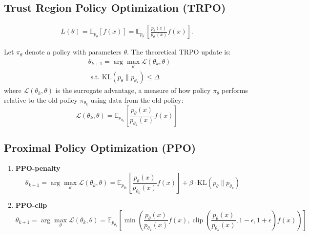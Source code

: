 \documentclass[
        11pt, %
	a4paper, %
]{LegrandOrangeBook}
\begin{document}
\subsection{Trust Region Policy Optimization (TRPO)}

\begin{align}
    L(\theta)
    =\mathbb{E}_{p_\theta}\left[f(x)\right]
    =\mathbb{E}_{p_{\theta^{\prime}}}\left[ \frac{p_\theta(x)}{p_{\theta^{\prime}}(x)} f(x)\right].
\end{align}

Let $\pi_\theta$ denote a policy with parameters $\theta$. The theoretical TRPO update is:
\begin{equation}
\begin{aligned}
& \theta_{k+1}=\arg \max _\theta \mathcal{L}\left(\theta_k, \theta\right) \\
& \text { s.t. } \mathrm{KL}\left(p_\theta \| p_{\theta_k} \right) \leq \Delta
\end{aligned}
\end{equation}
where $\mathcal{L}\left(\theta_k, \theta\right)$ is the surrogate advantage, a measure of how policy $\pi_\theta$ performs relative to the old policy $\pi_{\theta_k}$ using data from the old policy:
\begin{equation}
    \mathcal{L}\left(\theta_k, \theta\right)
=\mathbb{E}_{p_{\theta_k}}\left[ \frac{p_\theta(x)}{p_{\theta_k}(x)} f(x)\right]
\end{equation}

\subsection{Proximal Policy Optimization (PPO)}

\begin{enumerate}
    \item \textbf{PPO-penalty}
    \begin{equation}
    \theta_{k+1}=\arg \max _\theta
    \mathcal{L}\left(\theta_k, \theta\right)
    =\mathbb{E}_{p_{\theta_k}}\left[ \frac{p_\theta(x)}{p_{\theta_k}(x)} f(x)\right] + \beta \cdot \mathrm{KL}\left(p_\theta \| p_{\theta_k} \right)
\end{equation}
    \item \textbf{PPO-clip}
    \begin{equation}
    \theta_{k+1}=\arg \max _\theta
    \mathcal{L}\left(\theta_k, \theta\right)
    =\mathbb{E}_{p_{\theta_k}}\left[ \min \left(\frac{p_\theta(x)}{p_{\theta_k}(x)} f(x), \operatorname{clip}\left(\frac{p_\theta(x)}{p_{\theta_k}(x)}, 1-\epsilon, 1+\epsilon\right) f(x)\right) \right]
\end{equation}
\end{enumerate}
\end{document}
